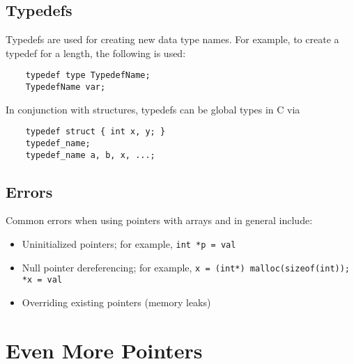 \documentclass{tufte-book}
\begin{document}
\begin{fullwidth}
\section{Typedefs}
Typedefs are used for creating new data type names. For example, to create a typedef for a length, the following is used:
\begin{lstlisting}
    typedef type TypedefName;
    TypedefName var;
\end{lstlisting}
In conjunction with structures, typedefs can be global types in C via
\begin{lstlisting}
    typedef struct { int x, y; }
    typedef_name;
    typedef_name a, b, x, ...;
\end{lstlisting}

\section{Errors}
Common errors when using pointers with arrays and in general include:
\begin{itemize}
    \item Uninitialized pointers; for example, \lstinline{int *p = val}
    \item Null pointer dereferencing; for example, \lstinline{x = (int*) malloc(sizeof(int)); *x = val}
    \item Overriding existing pointers (memory leaks)
\end{itemize}

\chapter{Even More Pointers}




\end{fullwidth}
\end{document}
